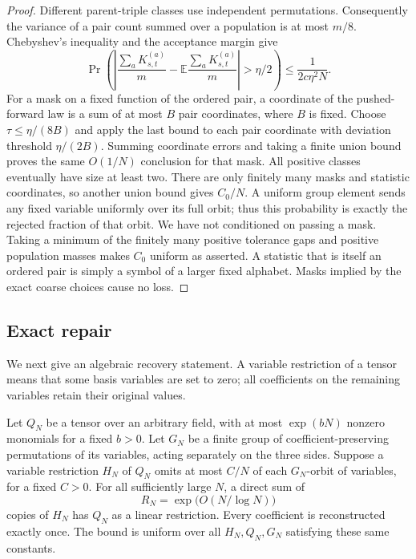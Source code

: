 \begin{proof}
Different parent-triple classes use independent permutations.
Consequently the variance of a pair count summed over a population
is at most $m/8$.  Chebyshev's inequality and the acceptance margin give
\[
 \Pr\left(\left|\frac{\sum_a K_{s,t}^{(a)}}m
       -\mathbb E\frac{\sum_a K_{s,t}^{(a)}}m\right|>\eta/2\right)
 \leq \frac{1}{2c\eta^2N}.
\]
For a mask on a fixed function of the ordered pair, a coordinate of
the pushed-forward law is a sum of at most $B$ pair coordinates,
where $B$ is fixed.  Choose $\tau\leq\eta/(8B)$ and apply the last
bound to each pair coordinate with deviation threshold $\eta/(2B)$.
Summing coordinate errors and taking a finite union bound proves the
same $O(1/N)$ conclusion for that mask.  All positive classes eventually
have size at least two.  There are only finitely many masks and
statistic coordinates, so another union bound gives $C_0/N$.
A uniform group element sends any fixed variable uniformly
over its full orbit; thus this probability is exactly the rejected
fraction of that orbit.  We have not conditioned on passing a mask.
Taking a minimum of the finitely many positive tolerance gaps and
positive population masses makes $C_0$ uniform as asserted.  A statistic
that is itself an ordered pair is simply a symbol of a larger fixed
alphabet.  Masks implied by the exact coarse choices cause no loss.
\end{proof}

\subsection{Exact repair}\label{sec:recovery-exact}

We next give an algebraic recovery statement.  A variable restriction
of a tensor means that some basis variables are set to zero; all
coefficients on the remaining variables retain their original values.

\begin{lemma}
\label{lem:hole-repair}
Let $Q_N$ be a tensor over an arbitrary field, with at most $\exp(bN)$
nonzero monomials for a fixed $b>0$.  Let $G_N$ be a finite group of
coefficient-preserving permutations of its variables, acting separately
on the three sides.  Suppose a variable restriction $H_N$ of $Q_N$
omits at most $C/N$ of each $G_N$-orbit of variables, for a fixed $C>0$.
For all sufficiently large $N$, a direct sum of
\[
 R_N=\exp\bigl(O(N/\log N)\bigr)
\]
copies of $H_N$ has $Q_N$ as a linear restriction.  Every coefficient
is reconstructed exactly once.  The bound is uniform over all
$H_N,Q_N,G_N$ satisfying these same constants.
\end{lemma}

